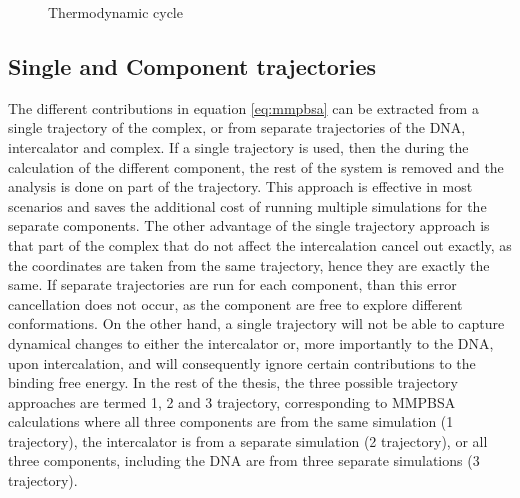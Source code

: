 \begin{figure}
  \centering
  
  \caption{Thermodynamic cycle}
  \label{fig:mmpbsacycle}
\end{figure}


\subsection{Single and Component trajectories}

The different contributions in equation \ref{eq:mmpbsa} can be extracted from a single trajectory of the complex, or from separate trajectories of the DNA, intercalator and complex. If a single trajectory is used, then the during the calculation of the different component, the rest of the system is removed and the analysis is done on part of the trajectory. This approach is effective in most scenarios and saves the additional cost of running multiple simulations for the separate components. The other advantage of the single trajectory approach is that part of the complex that do not affect the intercalation cancel out exactly, as the coordinates are taken from the same trajectory, hence they are exactly the same. If separate trajectories are run for each component, than this error cancellation does not occur, as the component are free to explore different conformations. On the other hand, a single trajectory will not be able to capture dynamical changes to either the intercalator or, more importantly to the DNA, upon intercalation, and will consequently ignore certain contributions to the binding free energy. In the rest of the thesis, the three possible trajectory approaches are termed 1, 2 and 3 trajectory, corresponding to MMPBSA calculations where all three components are from the same simulation (1 trajectory), the intercalator is from a separate simulation (2 trajectory), or all three components, including the DNA are from three separate simulations (3 trajectory). 
